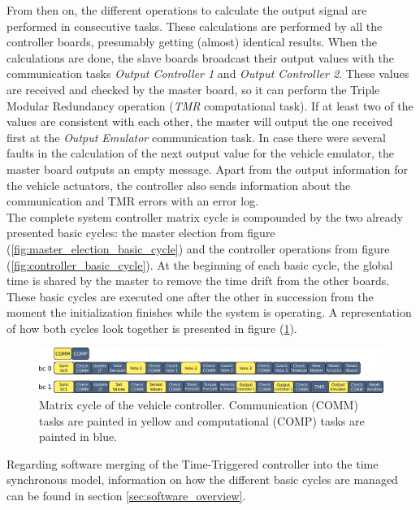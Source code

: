 \documentclass[table,xcdraw]{article}
\begin{document}
From then on, the different operations to calculate the output signal are performed in consecutive tasks. These calculations are performed by all the controller boards, presumably getting (almost) identical results. When the calculations are done, the slave boards broadcast their output values with the communication tasks \textit{Output Controller 1} and \textit{Output Controller 2}. These values are received and checked by the master board, so it can perform the Triple Modular Redundancy operation (\textit{TMR} computational task). If at least two of the values are consistent with each other, the master will output the one received first at the \textit{Output Emulator} communication task. In case there were several faults in the calculation of the next output value for the vehicle emulator, the master board outputs an empty message. Apart from the output information for the vehicle actuators, the controller also sends information about the communication and TMR errors with an error log.\\

The complete system controller matrix cycle is compounded by the two already presented basic cycles: the master election from figure (\ref{fig:master_election_basic_cycle}) and the controller operations from figure (\ref{fig:controller_basic_cycle}). At the beginning of each basic cycle, the global time is shared by the master to remove the time drift from the other boards. These basic cycles are executed one after the other in succession from the moment the initialization finishes while the system is operating. A representation of how both cycles look together is presented in figure (\ref{fig:matrix_cycle}).\\

\begin{figure}[h!]
    \centering
    \includegraphics[width=\textwidth]{figures/methodology/matrix_cycle_controller.png}
    \caption{Matrix cycle of the vehicle controller. Communication (COMM) tasks are painted in yellow and computational (COMP) tasks are painted in blue.}
    \label{fig:matrix_cycle}
\end{figure}

Regarding software merging of the Time-Triggered controller into the time synchronous model, information on how the different basic cycles are managed can be found in section \ref{sec:software_overview}.\\
\end{document}
